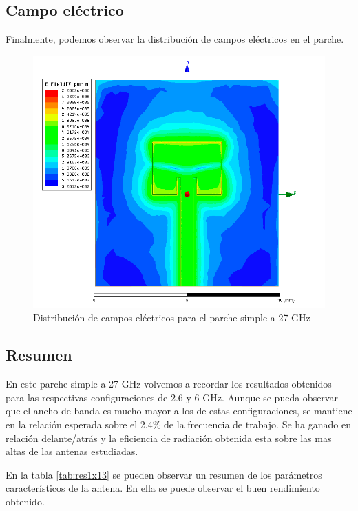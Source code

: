 \newpage
\subsection{Campo eléctrico}
\par Finalmente, podemos observar la distribución de campos eléctricos en el parche. 
\begin{figure}[H]
    \centering
        \includegraphics[width=\textwidth]{archivos/analisis/1x13/8}
        \caption{Distribución de campos eléctricos para el parche simple a 27 GHz}
        \label{fig:elec1x13}
\end{figure}


\subsection{Resumen}
\par En este parche simple a 27 GHz volvemos a recordar los resultados obtenidos para las respectivas configuraciones de 2.6 y 6 GHz. Aunque se pueda observar que el ancho de banda es mucho mayor a los de estas configuraciones, se mantiene en la relación esperada sobre el 2.4\% de la frecuencia de trabajo. Se ha ganado en relación delante/atrás y la eficiencia de radiación obtenida esta sobre las mas altas de las antenas estudiadas. 
\\
\par En la tabla \ref{tab:res1x13} se pueden observar un resumen de los parámetros característicos de la antena. En ella se puede observar el buen rendimiento obtenido.

